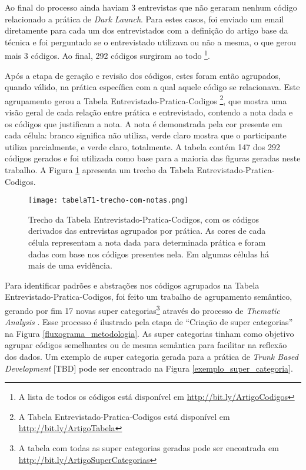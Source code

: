 Ao final do processo ainda haviam 3 entrevistas que não geraram nenhum código relacionado a prática de \emph{Dark Launch}. Para estes casos, foi enviado um email diretamente para cada um dos entrevistados com a definição do artigo base da técnica e foi perguntado se o entrevistado utilizava ou não a mesma, o que gerou mais 3 códigos. Ao final, 292 códigos surgiram ao todo \footnote{A lista de todos os códigos está disponível em \url{http://bit.ly/ArtigoCodigos}}.

Após a etapa de geração e revisão dos códigos, estes foram então agrupados, quando válido, na prática específica com a qual aquele código se relacionava. Este agrupamento gerou a Tabela Entrevistado-Pratica-Codigos \footnote{A Tabela Entrevistado-Pratica-Codigos está disponível em \url{http://bit.ly/ArtigoTabela}}, que mostra uma visão geral de cada relação entre prática e entrevistado, contendo a nota dada e os códigos que justificam a nota. A nota é demonstrada pela cor presente em cada célula: branco significa não utiliza, verde claro mostra que o participante utiliza parcialmente, e verde claro, totalmente. A tabela contém 147 dos 292 códigos gerados e foi utilizada como base para a maioria das figuras geradas neste trabalho. A Figura \ref{trecho_tabela_t1} apresenta um trecho da Tabela Entrevistado-Pratica-Codigos.

\begin{figure}[ht]
    \begin{center}
    \texttt{[image: tabelaT1-trecho-com-notas.png]}
    \end{center}
    \caption[Trecho da Tabela Entrevistado-Pratica-Codigos]{
        Trecho da Tabela Entrevistado-Pratica-Codigos, com os códigos derivados das entrevistas agrupados por prática. As cores de cada célula representam a nota dada para determinada prática e foram dadas com base nos códigos presentes nela. Em algumas células há mais de uma evidência.
}\label{trecho_tabela_t1}
\end{figure}

Para identificar padrões e abstrações nos códigos agrupados na Tabela Entrevistado-Pratica-Codigos, foi feito um trabalho de agrupamento semântico, gerando por fim 17 novas super categorias\footnote{A tabela com todas as super categorias geradas pode ser encontrada em \url{http://bit.ly/ArtigoSuperCategorias}} através do processo de \emph{Thematic Analysis} \cite{groundedTheory}. Esse processo é ilustrado pela etapa de ``Criação de super categorias'' na Figura \ref{fluxograma_metodologia}. As super categorias tinham como objetivo agrupar códigos semelhantes ou de mesma semântica para facilitar na reflexão dos dados. Um exemplo de super categoria gerada para a prática de \emph{Trunk Based Development} [TBD] pode ser encontrado na Figura \ref{exemplo_super_categoria}.


